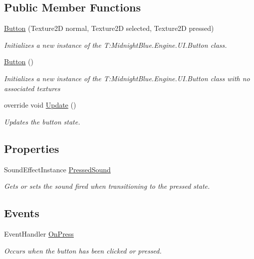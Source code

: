 \subsection*{Public Member Functions}
\begin{DoxyCompactItemize}
\item 
\hyperlink{class_midnight_blue_1_1_engine_1_1_u_i_1_1_button_a5ed868b2d292ab2c508e2545a64d7df7}{Button} (Texture2D normal, Texture2D selected, Texture2D pressed)
\begin{DoxyCompactList}\small\item\em Initializes a new instance of the T\+:\+Midnight\+Blue.\+Engine.\+U\+I.\+Button class. \end{DoxyCompactList}\item 
\hyperlink{class_midnight_blue_1_1_engine_1_1_u_i_1_1_button_a8eab19faf1ae29094379f9021d6382ab}{Button} ()
\begin{DoxyCompactList}\small\item\em Initializes a new instance of the T\+:\+Midnight\+Blue.\+Engine.\+U\+I.\+Button class with no associated textures \end{DoxyCompactList}\item 
override void \hyperlink{class_midnight_blue_1_1_engine_1_1_u_i_1_1_button_af3c04862d1bdc4e558966bcd7945b9fe}{Update} ()
\begin{DoxyCompactList}\small\item\em Updates the button state. \end{DoxyCompactList}\end{DoxyCompactItemize}
\subsection*{Properties}
\begin{DoxyCompactItemize}
\item 
Sound\+Effect\+Instance \hyperlink{class_midnight_blue_1_1_engine_1_1_u_i_1_1_button_a3b365aa470c13e835e14e6de1e4ed3d7}{Pressed\+Sound}
\begin{DoxyCompactList}\small\item\em Gets or sets the sound fired when transitioning to the pressed state. \end{DoxyCompactList}\end{DoxyCompactItemize}
\subsection*{Events}
\begin{DoxyCompactItemize}
\item 
Event\+Handler \hyperlink{class_midnight_blue_1_1_engine_1_1_u_i_1_1_button_af224f64410fde584da8df7703210147c}{On\+Press}
\begin{DoxyCompactList}\small\item\em Occurs when the button has been clicked or pressed. \end{DoxyCompactList}\end{DoxyCompactItemize}
